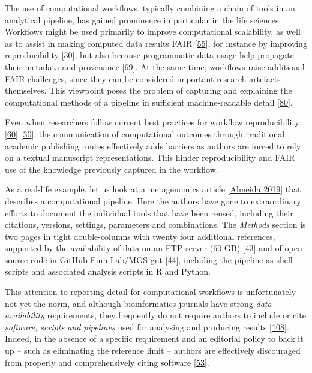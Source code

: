 The use of computational workflows, typically combining a chain of tools
in an analytical pipeline, has gained prominence in particular in the
life sciences. Workflows might be used primarily to improve
computational scalability, as well as to assist in making computed data
results FAIR {[}\href{https://doi.org/10.1162/dint_a_00033}{55}{]}, for
instance by improving reproducibility
{[}\href{https://doi.org/10.1016/j.future.2017.01.012}{30}{]}, but also
because programmatic data usage help propagate their metadata and
provenance {[}\href{https://doi.org/10.1002/cpe.1228}{69}{]}. At the
same time, workflows raise additional FAIR challenges, since they can be
considered important research artefacts themselves. This viewpoint poses
the problem of capturing and explaining the computational methods of a
pipeline in sufficient machine-readable detail
{[}\href{https://doi.org/10.3233/DS-190026}{80}{]}.

Even when researchers follow current best practices for workflow
reproducibility
{[}\href{https://doi.org/10.1016/j.cels.2018.03.014}{60}{]}
{[}\href{https://doi.org/10.1016/j.future.2017.01.012}{30}{]}, the
communication of computational outcomes through traditional academic
publishing routes effectively adds barriers as authors are forced to
rely on a textual manuscript representations. This hinder
reproducibility and FAIR use of the knowledge previously captured in the
workflow.

As a real-life example, let us look at a metagenomics article
{[}\href{https://doi.org/10.1038/s41586-019-0965-1}{Almeida 2019}{]} that describes
a computational pipeline. Here the authors have gone to extraordinary
efforts to document the individual tools that have been reused,
including their citations, versions, settings, parameters and
combinations. The \emph{Methods} section is two pages in tight
double-columns with twenty four additional references, supported by the
availability of data on an FTP server (60 GB)
\href{http://ftp.ebi.ac.uk/pub/databases/metagenomics/umgs_analyses/}{{[}43{]}}
and of open source code in GitHub
\href{https://github.com/Finn-Lab/MGS-gut}{Finn-Lab/MGS-gut}
\href{https://github.com/Finn-Lab/MGS-gut}{{[}44{]}}, including the
pipeline as shell scripts and associated analysis scripts in R and
Python.

This attention to reporting detail for computational workflows is
unfortunately not yet the norm, and although bioinformatics journals
have strong \emph{data availability} requirements, they frequently do
not require authors to include or cite \emph{software, scripts and
pipelines} used for analysing and producing results
\href{https://twitter.com/soilandreyes/status/1250721245622079488}{{[}108{]}}.
Indeed, in the absence of a specific requirement and an editorial policy
to back it up -- such as eliminating the reference limit -- authors are
effectively discouraged from properly and comprehensively citing
software {[}\href{https://doi.org/10.1038/s41592-019-0350-x}{53}{]}.

